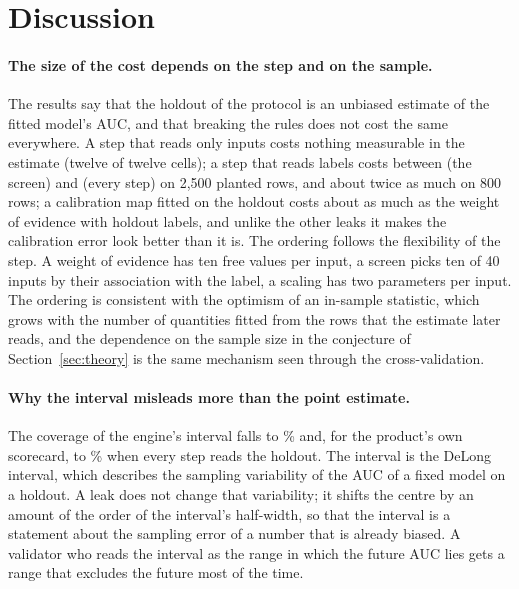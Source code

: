 \section{Discussion}
\label{sec:discussion}

\paragraph{The size of the cost depends on the step and on the sample.} The results say that the holdout of the protocol is an unbiased estimate of the fitted model's AUC, and that breaking the rules does not cost the same everywhere. A step that reads only inputs costs nothing measurable in the estimate (twelve of twelve cells); a step that reads labels costs between  (the screen) and  (every step) on 2,500 planted rows, and about twice as much on 800 rows; a calibration map fitted on the holdout costs about as much as the weight of evidence with holdout labels, and unlike the other leaks it makes the calibration error look better than it is. The ordering follows the flexibility of the step. A weight of evidence has ten free values per input, a screen picks ten of 40 inputs by their association with the label, a scaling has two parameters per input. The ordering is consistent with the optimism of an in-sample statistic, which grows with the number of quantities fitted from the rows that the estimate later reads, and the dependence on the sample size in the conjecture of Section~\ref{sec:theory} is the same mechanism seen through the cross-validation.

\paragraph{Why the interval misleads more than the point estimate.} The coverage of the engine's interval falls to \% and, for the product's own scorecard, to \% when every step reads the holdout. The interval is the DeLong interval, which describes the sampling variability of the AUC of a fixed model on a holdout. A leak does not change that variability; it shifts the centre by an amount of the order of the interval's half-width, so that the interval is a statement about the sampling error of a number that is already biased. A validator who reads the interval as the range in which the future AUC lies gets a range that excludes the future most of the time.

